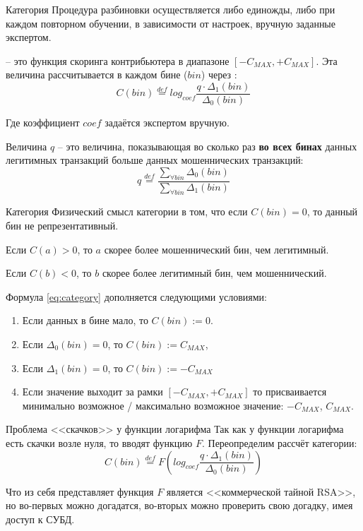 \begin{frame}{Категория}
	\footnotesize
	Процедура разбиновки осуществляется либо единожды, либо при каждом повторном обучении,
	в зависимости от настроек, вручную заданные экспертом.
	
	 -- это функция скоринга контрибьютера в диапазоне $[- C_{MAX}, + C_{MAX}]$. 
	Эта величина рассчитывается в каждом бине ($bin$) через :
	\begin{equation}\label{eq:category}
	C(bin) \stackrel{def}{=} log_{coef} \frac{q \cdot \Delta_1 (bin)}{\Delta_0 (bin)}
	\end{equation}
	
	Где коэффициент $coef$ задаётся экспертом вручную.
	
	Величина $q$ -- это величина, показывающая во сколько раз \textbf{во всех бинах} данных легитимных транзакций
	 больше данных мошеннических транзакций:
	\begin{equation}
	q \stackrel{def}{=} \frac{\sum_{\forall bin} \Delta_0(bin)}{\sum_{\forall bin} \Delta_1(bin)}
	\end{equation}
\end{frame}

\begin{frame}{Категория}
	\small
	Физический смысл категории в том, что если $C(bin)=0$, то данный бин не репрезентативный.
	
	Если $C(a)>0$, то $a$ скорее более мошеннический бин, чем легитимный.
	
	Если $C(b)<0$, то $b$ скорее более легитимный бин, чем мошеннический.
	
	Формула \eqref{eq:category} дополняется следующими условиями:
	\begin{enumerate}
		\item Если данных в бине мало, то $C(bin) := 0$.
		\item Если $\Delta_0 (bin) = 0$, то $C(bin) := C_{MAX} $,
		\item Если $\Delta_1 (bin) = 0$, то $C(bin) := -C_{MAX} $
		\item Если значение выходит за рамки $[-C_{MAX}, + C_{MAX}]$
		то присваивается минимально возможное / максимально возможное  значение: $-C_{MAX}$, $C_{MAX}$.
	\end{enumerate}
\end{frame}

\begin{frame}{Проблема <<скачков>> у функции логарифма}
	Так как у функции логарифма есть скачки возле нуля, то вводят  функцию $F$. Переопределим рассчёт категории:
	\begin{equation}
	C(bin) \stackrel{def}{=} F \left( log_{coef} \frac{q \cdot \Delta_1 (bin)}{\Delta_0 (bin)} \right)
	\end{equation}
	
	Что из себя представляет функция $F$ является <<коммерческой тайной RSA>>, 
	но во-первых можно догадатся, во-вторых можно проверить свою догадку, имея доступ к СУБД.
	
\end{frame}


